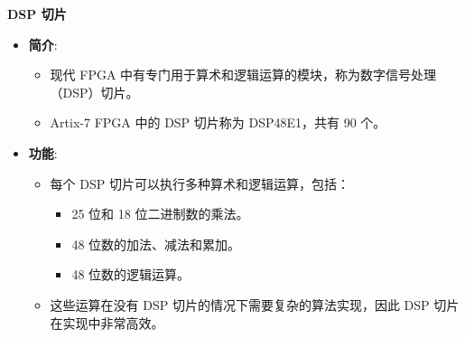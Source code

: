 \documentclass[
  ignorenonframetext,
  chinese,
]{beamer}
\providecommand{\tightlist}{%
  \setlength{\itemsep}{0pt}\setlength{\parskip}{0pt}}
\begin{document}
\begin{frame}
\begin{block}{\textbf{DSP 切片}}
\label{dsp-ux5207ux7247}
\begin{itemize}
\tightlist
\item
  \textbf{简介}:

  \begin{itemize}
  \tightlist
  \item
    现代 FPGA
    中有专门用于算术和逻辑运算的模块，称为数字信号处理（DSP）切片。
  \item
    Artix-7 FPGA 中的 DSP 切片称为 DSP48E1，共有 90 个。
  \end{itemize}
\item
  \textbf{功能}:

  \begin{itemize}
  \tightlist
  \item
    每个 DSP 切片可以执行多种算术和逻辑运算，包括：

    \begin{itemize}
    \tightlist
    \item
      25 位和 18 位二进制数的乘法。
    \item
      48 位数的加法、减法和累加。
    \item
      48 位数的逻辑运算。
    \end{itemize}
  \item
    这些运算在没有 DSP 切片的情况下需要复杂的算法实现，因此 DSP
    切片在实现中非常高效。
  \end{itemize}
\end{itemize}
\end{block}
\end{frame}
\end{document}
